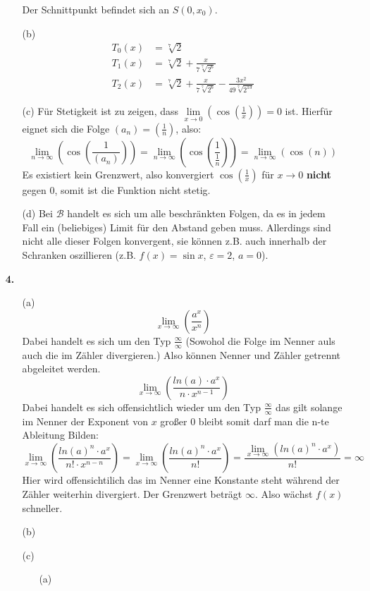 \documentclass[a4paper,11pt,fleqn]{scrartcl}
\newcommand{\bra}[1]{\left(#1\right)}
\newcommand{\limxn}[2]{\lim\limits_{x \rightarrow #1}\bra{#2}}
\newcommand{\limn}[1]{\lim\limits_{n \rightarrow \infty}\bra{#1}}
\newcommand{\limx}[1]{\lim\limits_{x \rightarrow \infty}\bra{#1}}
\begin{document}
\begin{enumerate}
\begin{enumerate}
                Der Schnittpunkt befindet sich an $S(0, x_0)$.

            \item[(b)]
                \[\begin{array}{ll}
                    T_0(x) &= \sqrt[7]{2} \\[0.5em]
                    T_1(x) &= \sqrt[7]{2} + \frac{x}{7 \sqrt[7]{2^6}} \\[0.5em]
                    T_2(x) &= \sqrt[7]{2} + \frac{x}{7 \sqrt[7]{2^6}} - \frac{3x^2}{49 \sqrt[7]{2^{13}} }
                \end{array}\]

            \item[(c)]
                Für Stetigkeit ist zu zeigen, dass $\limxn{0}{\cos\bra{\frac{1}{x}}} = 0$
                ist. Hierfür eignet sich die Folge $(a_n) = (\frac{1}{n})$, also:
                \[ \limn{\cos\bra{\frac{1}{(a_n)}}} =
                \limn{\cos\bra{\frac{1}{\frac{1}{n}}}} =
                \limn{\cos\bra{n}} \]
                Es existiert kein Grenzwert, also konvergiert $\cos\bra{\frac{1}{x}}$
                für $x \rightarrow 0$ \textbf{nicht} gegen $0$, somit ist die
                Funktion nicht stetig.

            \item[(d)]
                Bei $\mathcal{B}$ handelt es sich um alle beschränkten Folgen, da
                es in jedem Fall ein (beliebiges) Limit für den Abstand geben
                muss. Allerdings sind nicht alle dieser Folgen konvergent, sie
                können z.B. auch innerhalb der Schranken oszillieren (z.B.
                $f(x) = \sin x$, $\varepsilon = 2$, $a = 0$).

        \end{enumerate}
    \item[\textbf{4.}]
        \begin{enumerate}
            \item[(a)]
                \[ \limx{ \frac{a^x}{x^n} }\] Dabei handelt es sich um den Typ $\frac{\infty}{\infty}$ (Sowohol die Folge im Nenner auls auch die im Zähler divergieren.)
                Also können Nenner und Zähler getrennt abgeleitet werden. 
                \[\limx{\frac{ln(a) \cdot a^x}{n \cdot x^{n-1}}}\] Dabei handelt es sich offensichtlich wieder um den Typ $\frac{\infty}{\infty}$ das gilt solange im Nenner der Exponent von $x$ großer 0 bleibt somit darf man die n-te Ableitung Bilden:
                \[\limx{\frac{ln(a)^n \cdot a^x}{n! \cdot x^{n-n}}} = \limx{\frac{ln(a)^n \cdot a^x}{n!}} = \frac{\limx{ln(a)^n \cdot a^x}}{n!} = \infty\]
                Hier wird offensichtilich das im Nenner eine Konstante steht während der Zähler weiterhin divergiert. Der Grenzwert beträgt $\infty$. Also wächst $f(x)$ schneller.
            \item[(b)]
            \item[(c)]
                \begin{enumerate}
                \item[(a)]
                \end{enumerate}
        \end{enumerate}
\end{enumerate}
\end{document}
